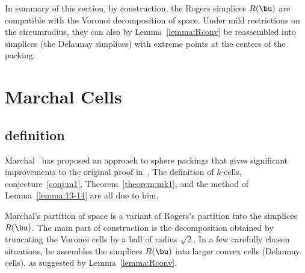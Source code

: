In summary of this section, by construction, the Rogers simplices
$R(\bu)$ are compatible with the Voronoi decomposition of space.
Under mild restrictions on the circumradius, they can also by
Lemma~\ref{lemma:Rconv} be reassembled into simplices (the Delaunay
simplices) with extreme points at the centers of the packing.
%
%




\section{Marchal Cells}

\subsection{definition}

Marchal~\cite{marchal:2009} has proposed an approach to sphere
packings that gives significant improvements to the original proof
in~\cite{Hales:2006:DCG}.  The definition of $k$-cells,
conjecture~\ref{conj:m1}, Theorem~\ref{theorem:mk1}, and the method of
Lemma~\ref{lemma:13-14} are all due to him.  
%


Marchal's partition of space is a variant of Rogers's partition into
the simplices $R(\bu)$.  The main part of construction is the
decomposition obtained by truncating the Voronoi cells by a ball of
radius $\sqrt2$.  In a few carefully chosen situations, he assembles
the simplices $R(\bu)$ into larger convex cells (Delaunay cells), as
suggested by Lemma~\ref{lemma:Rconv}.




